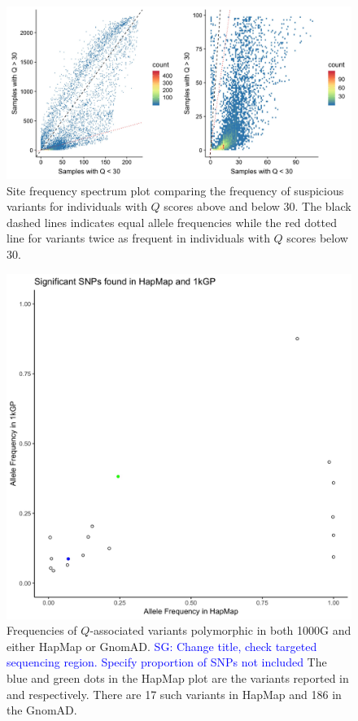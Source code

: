 \documentclass[9pt,lineno]{elife}
\newcommand{\sgcomment}[1]{\textcolor{blue}{SG: #1}}
\begin{document}
\begin{figure}[h]
\centering
\includegraphics[width=15cm,keepaspectratio]{./Figures/OverUnder30.jpg}
\caption{Site frequency spectrum plot comparing the frequency of suspicious variants for individuals with $Q$ scores above and below 30. The black dashed lines indicates equal allele frequencies while the red dotted line for variants twice as frequent in individuals with $Q$ scores below 30.}  
\label{90HanSFS_full}
\end{figure}


\begin{figure}[h]
\includegraphics[width=\hsize,keepaspectratio]{./Figures/Hap.jpg}
\caption{Frequencies of $Q$-associated variants polymorphic in both 1000G and either HapMap or GnomAD. \sgcomment{Change title, check targeted  sequencing region. Specify proportion of SNPs not included} The blue and green dots in the HapMap plot are the variants reported in \citep{Mandage2017} and \citep{Kraja2011} respectively. There are 17 such variants in HapMap and 186 in the GnomAD.}
\label{HapMap_GnomAD}
\end{figure}
\end{document}
